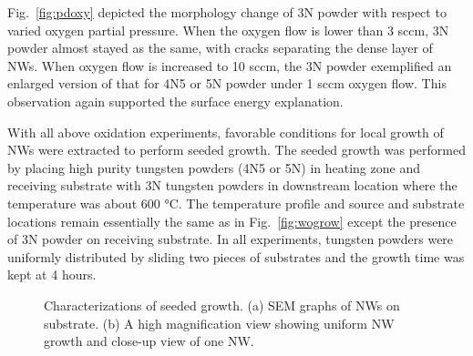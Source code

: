 Fig.~\ref{fig:pdoxy} depicted the morphology change of 3N powder with respect to varied oxygen partial pressure. When the oxygen flow is lower than 3 sccm, 3N powder almost stayed as the same, with cracks separating the dense layer of NWs. When oxygen flow is increased to 10 sccm, the 3N powder exemplified an enlarged version of that for 4N5 or 5N powder under 1 sccm oxygen flow. This observation again supported the surface energy explanation.

With all above oxidation experiments, favorable conditions for local growth of NWs were extracted to perform seeded growth. The seeded growth was performed by placing high purity tungsten powders (4N5 or 5N) in heating zone and receiving substrate with 3N tungsten powders in downstream location where the temperature was about 600 \si{\degreeCelsius}. The temperature profile and source and substrate locations remain essentially the same as in Fig.~\ref{fig:wogrow} except the presence of 3N powder on receiving substrate. In all experiments, tungsten powders were uniformly distributed by sliding two pieces of substrates and the growth time was kept at 4 hours.
\begin{figure}[htb]
\centering
{}\hspace{0.04\textwidth}
\caption[Characterization of seeded growth : SEM]{Characterizations of seeded growth. (a) SEM graphs of  NWs on  substrate. (b) A high magnification view showing uniform NW growth and close-up view of one NW. }
\label{fig:woseedsem}
\end{figure}


